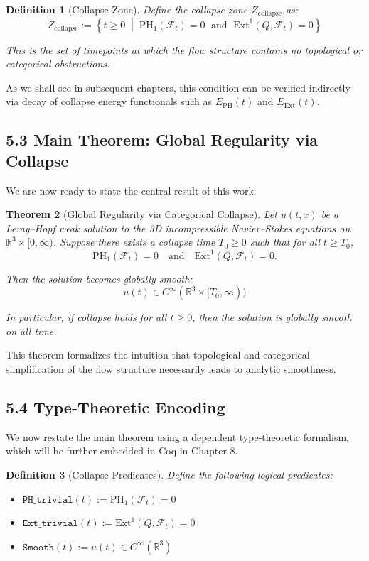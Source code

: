 \documentclass[11pt]{article}
\newtheorem{theorem}{Theorem}[section]
\newtheorem{definition}[theorem]{Definition}
\begin{document}
\begin{definition}[Collapse Zone]
Define the collapse zone \( Z_{\mathrm{collapse}} \) as:
\[
Z_{\mathrm{collapse}} := \left\{ t \ge 0 \;\middle|\; \mathrm{PH}_1(\mathcal{F}_t) = 0 \;\text{ and }\; \mathrm{Ext}^1(Q, \mathcal{F}_t) = 0 \right\}
\]

This is the set of timepoints at which the flow structure contains no topological or categorical obstructions.
\end{definition}

As we shall see in subsequent chapters, this condition can be verified indirectly via decay of collapse energy functionals such as \( E_{\mathrm{PH}}(t) \) and \( E_{\mathrm{Ext}}(t) \).

\subsection{5.3 Main Theorem: Global Regularity via Collapse}

We are now ready to state the central result of this work.

\begin{theorem}[Global Regularity via Categorical Collapse]
\label{thm:main}
Let \( u(t,x) \) be a Leray–Hopf weak solution to the 3D incompressible Navier–Stokes equations on \( \mathbb{R}^3 \times [0,\infty) \).  
Suppose there exists a collapse time \( T_0 \ge 0 \) such that for all \( t \ge T_0 \),
\[
\mathrm{PH}_1(\mathcal{F}_t) = 0 \quad \text{and} \quad \mathrm{Ext}^1(Q, \mathcal{F}_t) = 0.
\]

Then the solution becomes globally smooth:
\[
u(t) \in C^\infty(\mathbb{R}^3 \times [T_0, \infty))
\]

In particular, if collapse holds for all \( t \ge 0 \), then the solution is globally smooth on all time.
\end{theorem}

This theorem formalizes the intuition that topological and categorical simplification of the flow structure necessarily leads to analytic smoothness.

\subsection{5.4 Type-Theoretic Encoding}

We now restate the main theorem using a dependent type-theoretic formalism, which will be further embedded in Coq in Chapter 8.

\begin{definition}[Collapse Predicates]
Define the following logical predicates:
\begin{itemize}
  \item \( \texttt{PH\_trivial}(t) := \mathrm{PH}_1(\mathcal{F}_t) = 0 \)
  \item \( \texttt{Ext\_trivial}(t) := \mathrm{Ext}^1(Q, \mathcal{F}_t) = 0 \)
  \item \( \texttt{Smooth}(t) := u(t) \in C^\infty(\mathbb{R}^3) \)
\end{itemize}
\end{definition}
\end{document}
